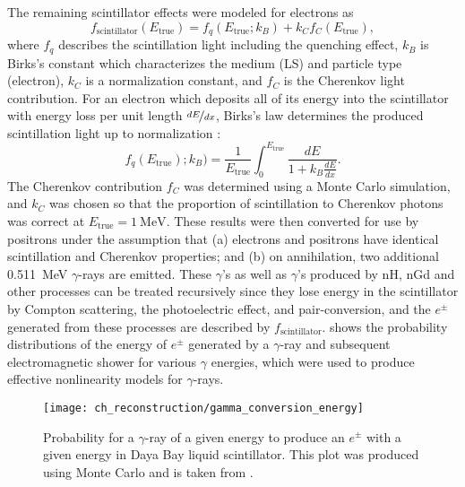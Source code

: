 The remaining scintillator effects were modeled for electrons as
\begin{equation}
    f_{\text{scintillator}}(E_{\text{true}}) =
    f_q(E_{\text{true}};k_B) + k_Cf_C(E_{\text{true}}),
\end{equation}
where $f_q$ describes the scintillation light including the quenching effect,
$k_B$ is Birks's constant which characterizes the medium (LS)
and particle type (electron),
$k_C$ is a normalization constant,
and $f_C$ is the Cherenkov light contribution.
For an electron which deposits all of its energy into the scintillator
with energy loss per unit length $\nicefrac{dE}{dx}$,
Birks's law determines the produced scintillation light up to normalization \cite{birks}:
\begin{equation}
    f_q(E_{\text{true}});k_B) = \frac{1}{E_{\text{true}}} \int_0^{E_{\text{true}}}
    \frac{dE}{1+k_B\frac{dE}{dx}}.
\end{equation}
The Cherenkov contribution $f_C$ was determined using a Monte Carlo simulation,
and $k_C$ was chosen so that the proportion of scintillation to Cherenkov photons
was correct at $E_{\text{true}} = \SI{1}{\MeV}$.
These results were then converted for use by positrons under the assumption that
(a) electrons and positrons have identical scintillation and Cherenkov properties;
and (b) on annihilation, two additional \SI{0.511}{\MeV} $\gamma$-rays are emitted.
These $\gamma$'s as well as $\gamma$'s produced by nH, nGd and other processes
can be treated recursively
since they lose energy in the scintillator
by Compton scattering, the photoelectric effect, and pair-conversion,
and the $e^{\pm}$ generated from these processes
are described by $f_{\text{scintillator}}$.
 shows the probability distributions
of the energy of $e^{\pm}$ generated by a $\gamma$-ray
and subsequent electromagnetic shower for various $\gamma$ energies,
which were used to produce effective nonlinearity models for $\gamma$-rays.

\begin{figure}
    \centering
    \texttt{[image: ch\_reconstruction/gamma\_conversion\_energy]}
    \caption[$e^{\pm}$ spectrum from $\gamma$-rays]{
        Probability for a $\gamma$-ray of a given energy to produce
        an $e^{\pm}$ with a given energy in Daya Bay liquid scintillator.
        This plot was produced using Monte Carlo and is taken from \cite{nonlinearity1}.
    }
    \label{fig:gamma_conversion}
\end{figure}

